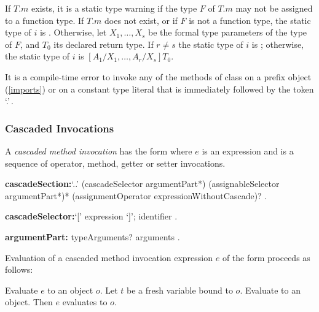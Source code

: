 \documentclass{article}
\begin{document}
\LMHash{}
If $T.m$ exists, it is a static type warning if the type $F$ of $T.m$ may not be assigned to a function type.
If $T.m$ does not exist, or if $F$ is not a function type, the static type of $i$ is \DYNAMIC{}.
Otherwise, let $X_1, \ldots, X_s$ be the formal type parameters of the type of $F$,
and $T_0$ its declared return type.
If $r \not= s$ the static type of $i$ is \DYNAMIC{};
otherwise, the static type of $i$ is $[A_1/X_1, \ldots, A_r/X_s]T_0$.


\LMHash{}
It is a compile-time error to invoke any of the methods of class  on a prefix object (\ref{imports}) or on a constant type literal that is immediately followed by the token `.'\,.


\subsubsection{Cascaded Invocations}

\LMHash{}
A {\em cascaded method invocation} has the form 
where $e$ is an expression and  is a sequence of operator, method, getter or setter invocations.

\begin{grammar}
{\bf cascadeSection:}`{\escapegrammar ..}' (cascadeSelector argumentPart*)
  \gnewline{} (assignableSelector argumentPart*)*
  \gnewline{} (assignmentOperator expressionWithoutCascade)?
  .

{\bf cascadeSelector:}`[' expression `]';
  identifier
  .

{\bf argumentPart:}
  typeArguments? arguments
  .
\end{grammar}

\LMHash{}
Evaluation of a cascaded method invocation expression $e$ of the form  proceeds as follows:

Evaluate $e$ to an object $o$.
Let $t$ be a fresh variable bound to $o$.
Evaluate  to an object.
Then $e$ evaluates to $o$.

\end{document}
